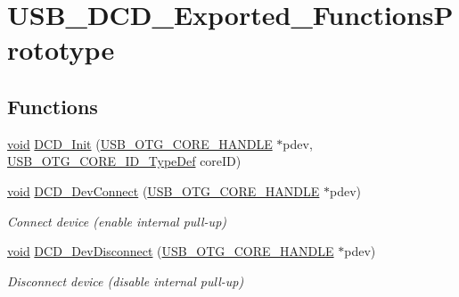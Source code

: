 \hypertarget{group___u_s_b___d_c_d___exported___functions_prototype}{\section{U\-S\-B\-\_\-\-D\-C\-D\-\_\-\-Exported\-\_\-\-Functions\-Prototype}
\label{group___u_s_b___d_c_d___exported___functions_prototype}
}
\subsection*{Functions}
\begin{DoxyCompactItemize}
\item 
\hyperlink{group___n_a_m_e_ga18028b8badbf1ea7e704ccac3c488e82}{void} \hyperlink{group___u_s_b___d_c_d___exported___functions_prototype_ga32ea24db123f7f8bb0edfb4f97c1c892}{D\-C\-D\-\_\-\-Init} (\hyperlink{group___u_s_b___c_o_r_e___exported___types_gaf76054c11eb8a3367907aad7ae700e80}{U\-S\-B\-\_\-\-O\-T\-G\-\_\-\-C\-O\-R\-E\-\_\-\-H\-A\-N\-D\-L\-E} $\ast$pdev, \hyperlink{group___u_s_b___d_e_f_i_n_e_s___exported___types_gab31b9dd0bc08bf6120424c20bda8eb7e}{U\-S\-B\-\_\-\-O\-T\-G\-\_\-\-C\-O\-R\-E\-\_\-\-I\-D\-\_\-\-Type\-Def} core\-I\-D)
\item 
\hyperlink{group___n_a_m_e_ga18028b8badbf1ea7e704ccac3c488e82}{void} \hyperlink{group___u_s_b___d_c_d___exported___functions_prototype_gae86236f273ed0499af2ab44915ff3983}{D\-C\-D\-\_\-\-Dev\-Connect} (\hyperlink{group___u_s_b___c_o_r_e___exported___types_gaf76054c11eb8a3367907aad7ae700e80}{U\-S\-B\-\_\-\-O\-T\-G\-\_\-\-C\-O\-R\-E\-\_\-\-H\-A\-N\-D\-L\-E} $\ast$pdev)
\begin{DoxyCompactList}\small\item\em Connect device (enable internal pull-\/up) \end{DoxyCompactList}\item 
\hyperlink{group___n_a_m_e_ga18028b8badbf1ea7e704ccac3c488e82}{void} \hyperlink{group___u_s_b___d_c_d___exported___functions_prototype_gabceac3831bd896522e96c5885ac9ac3b}{D\-C\-D\-\_\-\-Dev\-Disconnect} (\hyperlink{group___u_s_b___c_o_r_e___exported___types_gaf76054c11eb8a3367907aad7ae700e80}{U\-S\-B\-\_\-\-O\-T\-G\-\_\-\-C\-O\-R\-E\-\_\-\-H\-A\-N\-D\-L\-E} $\ast$pdev)
\begin{DoxyCompactList}\small\item\em Disconnect device (disable internal pull-\/up) \end{DoxyCompactList}\item 

\end{DoxyCompactItemize}
